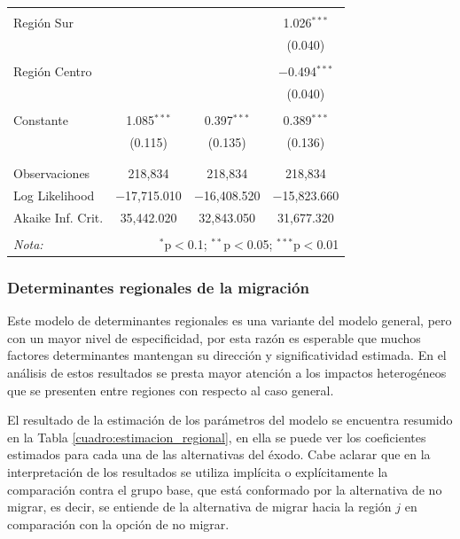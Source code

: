 \documentclass[12pt,a4paper]{article}
\begin{document}
\begin{table}[!htbp]
\begin{tabular}{@{\extracolsep{5pt}}lccc}
  & & & \\ 
 Región Sur &  &  & 1.026$^{***}$ \\ 
  &  &  & (0.040) \\ 
  & & & \\ 
 Región Centro &  &  & $-$0.494$^{***}$ \\ 
  &  &  & (0.040) \\ 
  & & & \\ 
 Constante & 1.085$^{***}$ & 0.397$^{***}$ & 0.389$^{***}$ \\ 
  & (0.115) & (0.135) & (0.136) \\ 
  & & & \\ 
\hline \\[-1.8ex] 
Observaciones & 218,834 & 218,834 & 218,834 \\ 
Log Likelihood & $-$17,715.010 & $-$16,408.520 & $-$15,823.660 \\ 
Akaike Inf. Crit. & 35,442.020 & 32,843.050 & 31,677.320 \\ 
\hline 
\hline \\[-1.8ex] 
\textit{Nota:}  & \multicolumn{3}{r}{$^{*}$p$<$0.1; $^{**}$p$<$0.05; $^{***}$p$<$0.01} \\ 
\end{tabular} 
\end{table} 



\subsubsection{Determinantes regionales de la migración}
Este modelo de determinantes regionales es una variante del modelo general, pero con un mayor nivel de especificidad, por esta razón es esperable que muchos factores determinantes mantengan su dirección y significatividad estimada. En el análisis de estos resultados se presta mayor atención a los impactos heterogéneos que se presenten entre regiones con respecto al caso general.

El resultado de la estimación de los parámetros del modelo se encuentra resumido en la Tabla \ref{cuadro:estimacion_regional}, en ella se puede ver los coeficientes estimados para cada una de las alternativas del éxodo. Cabe aclarar que en la interpretación de los resultados se utiliza implícita o explícitamente la comparación contra el grupo base, que está conformado por la alternativa de no migrar, es decir, se entiende de la alternativa de migrar hacia la región $j$ en comparación con la opción de no migrar.
\end{document}
